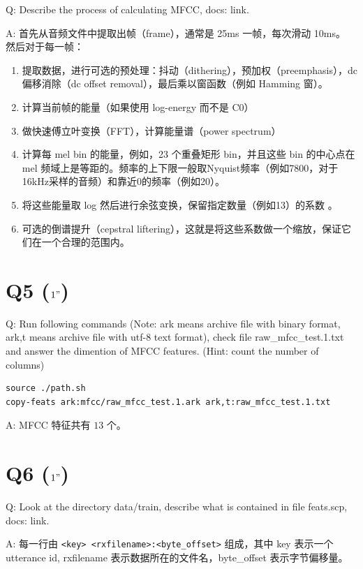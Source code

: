\documentclass[degree=project,degree-type=project,cjk-font=noto]{thuthesis}
\begin{document}
Q: Describe the process of calculating MFCC, docs: link.

A: 首先从音频文件中提取出帧（frame），通常是 25ms 一帧，每次滑动 10ms。
然后对于每一帧：

\begin{enumerate}
  \item 提取数据，进行可选的预处理：抖动（dithering），预加权（preemphasis），dc 偏移消除（dc offset removal），最后乘以窗函数（例如 Hamming 窗）。
  \item 计算当前帧的能量（如果使用 log-energy 而不是 C0）
  \item 做快速傅立叶变换（FFT），计算能量谱（power spectrum）
  \item 计算每 mel bin 的能量，例如，23 个重叠矩形 bin，并且这些 bin 的中心点在 mel 频域上是等距的。频率的上下限一般取Nyquist频率（例如7800，对于16kHz采样的音频）和靠近0的频率（例如20）。
  \item 将这些能量取 log 然后进行余弦变换，保留指定数量（例如13）的系数 。
  \item 可选的倒谱提升（cepstral liftering），这就是将这些系数做一个缩放，保证它们在一个合理的范围内。
\end{enumerate}

\section{Q5 ($1"$)}

Q: Run following commands (Note: ark means archive file with binary format, ark,t means archive file with utf-8 text format), check file raw\_mfcc\_test.1.txt and answer the dimention of MFCC features. (Hint: count the number of columns)
  \begin{verbatim}
source ./path.sh
copy-feats ark:mfcc/raw_mfcc_test.1.ark ark,t:raw_mfcc_test.1.txt
  \end{verbatim}

A: MFCC 特征共有 $13$ 个。

\section{Q6 ($1"$)}

Q: Look at the directory data/train, describe what is contained in file feats.scp, docs: link.

A: 每一行由 \texttt{<key> <rxfilename>:<byte\_offset>} 组成，其中 key 表示一个 utterance id, rxfilename 表示数据所在的文件名，byte\_offset 表示字节偏移量。
\end{document}
